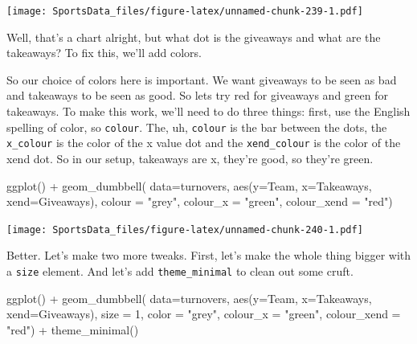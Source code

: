\documentclass[
]{book}
\newenvironment{Shaded}{\begin{snugshade}}{\end{snugshade}}
\newcommand{\AttributeTok}[1]{\textcolor[rgb]{0.77,0.63,0.00}{#1}}
\newcommand{\DecValTok}[1]{\textcolor[rgb]{0.00,0.00,0.81}{#1}}
\newcommand{\FunctionTok}[1]{\textcolor[rgb]{0.00,0.00,0.00}{#1}}
\newcommand{\NormalTok}[1]{#1}
\newcommand{\SpecialCharTok}[1]{\textcolor[rgb]{0.00,0.00,0.00}{#1}}
\newcommand{\StringTok}[1]{\textcolor[rgb]{0.31,0.60,0.02}{#1}}
\begin{document}
\texttt{[image: SportsData\_files/figure-latex/unnamed-chunk-239-1.pdf]}

Well, that's a chart alright, but what dot is the giveaways and what are the takeaways? To fix this, we'll add colors.

So our choice of colors here is important. We want giveaways to be seen as bad and takeaways to be seen as good. So lets try red for giveaways and green for takeaways. To make this work, we'll need to do three things: first, use the English spelling of color, so \texttt{colour}. The, uh, \texttt{colour} is the bar between the dots, the \texttt{x\_colour} is the color of the x value dot and the \texttt{xend\_colour} is the color of the xend dot. So in our setup, takeaways are x, they're good, so they're green.

\begin{Shaded}
\begin{Highlighting}[]
\FunctionTok{ggplot}\NormalTok{() }\SpecialCharTok{+} 
  \FunctionTok{geom\_dumbbell}\NormalTok{(}
    \AttributeTok{data=}\NormalTok{turnovers, }
    \FunctionTok{aes}\NormalTok{(}\AttributeTok{y=}\NormalTok{Team, }\AttributeTok{x=}\NormalTok{Takeaways, }\AttributeTok{xend=}\NormalTok{Giveaways),}
    \AttributeTok{colour =} \StringTok{"grey"}\NormalTok{,}
    \AttributeTok{colour\_x =} \StringTok{"green"}\NormalTok{,}
    \AttributeTok{colour\_xend =} \StringTok{"red"}\NormalTok{)}
\end{Highlighting}
\end{Shaded}

\texttt{[image: SportsData\_files/figure-latex/unnamed-chunk-240-1.pdf]}

Better. Let's make two more tweaks. First, let's make the whole thing bigger with a \texttt{size} element. And let's add \texttt{theme\_minimal} to clean out some cruft.

\begin{Shaded}
\begin{Highlighting}[]
\FunctionTok{ggplot}\NormalTok{() }\SpecialCharTok{+} 
  \FunctionTok{geom\_dumbbell}\NormalTok{(}
    \AttributeTok{data=}\NormalTok{turnovers, }
    \FunctionTok{aes}\NormalTok{(}\AttributeTok{y=}\NormalTok{Team, }\AttributeTok{x=}\NormalTok{Takeaways, }\AttributeTok{xend=}\NormalTok{Giveaways),}
    \AttributeTok{size =} \DecValTok{1}\NormalTok{,}
    \AttributeTok{color =} \StringTok{"grey"}\NormalTok{,}
    \AttributeTok{colour\_x =} \StringTok{"green"}\NormalTok{,}
    \AttributeTok{colour\_xend =} \StringTok{"red"}\NormalTok{) }\SpecialCharTok{+} 
  \FunctionTok{theme\_minimal}\NormalTok{()}
\end{Highlighting}
\end{Shaded}
\end{document}

